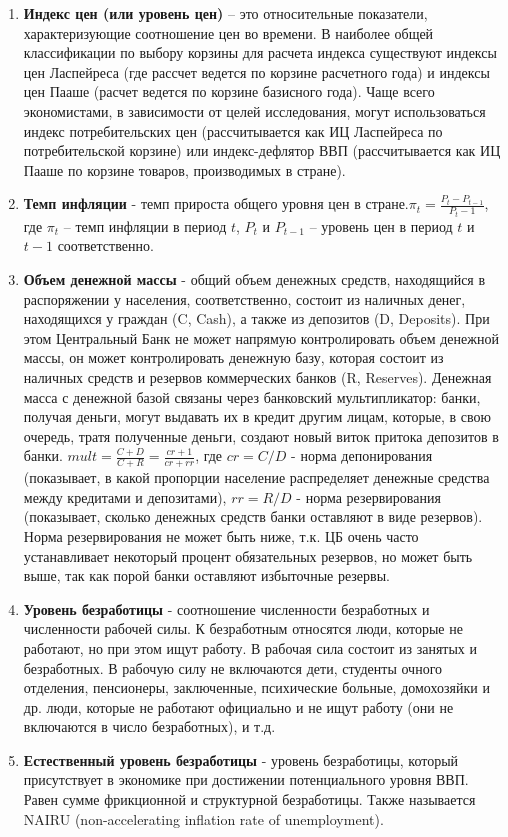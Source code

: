 \documentclass[12pt,a4paper]{article}
\begin{document}
\begin{enumerate}
\item \textbf{Индекс цен (или уровень цен)} – это относительные показатели, характеризующие соотношение цен во времени. В наиболее общей классификации по выбору корзины для расчета индекса существуют индексы цен Ласпейреса (где рассчет ведется по корзине расчетного года) и индексы цен Пааше (расчет ведется по корзине базисного года). Чаще всего экономистами, в зависимости от целей исследования, могут использоваться индекс потребительских цен (рассчитывается как ИЦ Ласпейреса по потребительской корзине)  или индекс-дефлятор ВВП (рассчитывается как ИЦ Пааше по корзине товаров, производимых в стране). 
\item \textbf{Темп инфляции} -  темп прироста общего уровня цен в стране.$\pi_t=\frac{P_t-P_{t-1}}{P_t-1}$, где $\pi_t$ – темп инфляции в период $t$, $P_t$ и $P_{t-1}$  – уровень цен в период $t$ и $t-1$ соответственно. 
\item \textbf{Объем денежной массы} - общий объем денежных средств, находящийся в распоряжении у населения, соответственно, состоит из наличных денег, находящихся у граждан (C, Cash),  а также из депозитов (D, Deposits). При этом Центральный Банк не может напрямую контролировать объем денежной массы, он может контролировать денежную базу, которая состоит из наличных средств и резервов коммерческих банков (R, Reserves). Денежная масса с денежной базой связаны через банковский мультипликатор: банки, получая деньги, могут выдавать их в кредит другим лицам, которые, в свою очередь, тратя полученные деньги, создают новый виток притока депозитов в банки. $mult=\frac{C+D}{C+R}=\frac{cr+1}{cr+rr}$, где $cr=C/D$ - норма депонирования (показывает, в какой пропорции население распределяет денежные средства между кредитами и депозитами), $rr=R/D$ - норма резервирования (показывает, сколько денежных средств банки оставляют в виде резервов). Норма резервирования не может быть ниже, т.к. ЦБ очень часто устанавливает некоторый процент обязательных резервов, но может быть выше, так как порой банки оставляют избыточные резервы. 
\item \textbf{Уровень безработицы} - соотношение численности безработных и численности рабочей силы. К безработным относятся люди, которые не работают, но при этом ищут работу. В рабочая сила состоит из занятых и безработных. В рабочую силу не включаются дети, студенты очного отделения, пенсионеры, заключенные, психические больные, домохозяйки и др. люди, которые не работают официально и не ищут работу (они не включаются в число безработных), и т.д. 
\item \textbf{Естественный уровень безработицы} - уровень безработицы, который присутствует в экономике при достижении потенциального уровня ВВП. Равен сумме фрикционной и структурной безработицы. Также называется NAIRU (non-accelerating inflation rate of unemployment).

\end{enumerate}
\end{document}
